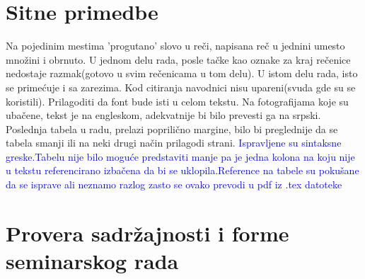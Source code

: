 \documentclass[a4paper]{report}
\newcommand{\odgovor}[1]{\textcolor{blue}{#1}}
\begin{document}
\section{Sitne primedbe}
Na pojedinim mestima 'progutano' slovo u reči, napisana reč u jednini umesto množini i obrnuto. U jednom delu rada, posle tačke kao oznake za kraj rečenice nedostaje razmak(gotovo u svim rečenicama u tom delu). U istom delu rada, isto se primećuje i sa zarezima. Kod citiranja navodnici nisu upareni(svuda gde su se koristili). Prilagoditi da font bude isti u celom tekstu.
Na fotografijama koje su ubačene, tekst je na engleskom, adekvatnije bi bilo prevesti ga na srpski.
Poslednja tabela u radu, prelazi poprilično margine, bilo bi preglednije da se tabela smanji ili na neki drugi način prilagodi strani.
\odgovor {Ispravljene su sintaksne greske.Tabelu nije bilo moguće predstaviti manje pa je jedna kolona na koju nije u tekstu referencirano izbačena da bi se uklopila.Reference na tabele su pokušane da se isprave ali neznamo razlog zasto se ovako prevodi u pdf iz .tex datoteke}



\section{Provera sadržajnosti i forme seminarskog rada}
\end{document}
